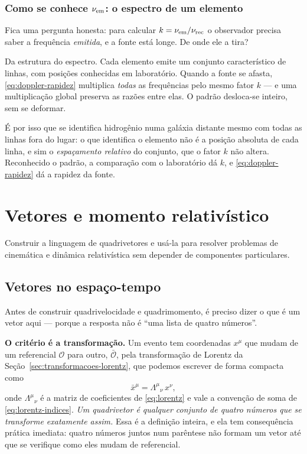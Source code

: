 \documentclass[12pt,a4paper,oneside]{book}
\theoremstyle{rgplain}
\theoremstyle{rgremark}
\newcommand{\obs}{\mathcal{O}}
\newcommand{\obsl}{\bar{\mathcal{O}}}
\begin{document}
\subsection*{Como se conhece $\nu_{\rm em}$: o espectro de um elemento}

Fica uma pergunta honesta: para calcular $k=\nu_{\rm em}/\nu_{\rm rec}$ o
observador precisa saber a frequência \emph{emitida}, e a fonte está longe. De
onde ele a tira?

Da estrutura do espectro. Cada elemento emite um conjunto característico de
linhas, com posições conhecidas em laboratório. Quando a fonte se afasta,
\eqref{eq:doppler-rapidez} multiplica \emph{todas} as frequências pelo mesmo
fator $k$ --- e uma multiplicação global preserva as razões entre elas. O
padrão desloca-se inteiro, sem se deformar.

\begin{atencao}
É por isso que se identifica hidrogênio numa galáxia distante mesmo com todas
as linhas fora do lugar: o que identifica o elemento não é a posição absoluta
de cada linha, e sim o \emph{espaçamento relativo} do conjunto, que o fator $k$
não altera. Reconhecido o padrão, a comparação com o laboratório dá $k$, e
\eqref{eq:doppler-rapidez} dá a rapidez da fonte.
\end{atencao}

\chapter{Vetores e momento relativístico}
\label{chap:vetores}

\begin{objetivos}
Construir a linguagem de quadrivetores e usá-la para resolver problemas de
cinemática e dinâmica relativística sem depender de componentes particulares.
\end{objetivos}

\section{Vetores no espaço-tempo}
\label{sec:vetores-espacotempo}

Antes de construir quadrivelocidade e quadrimomento, é preciso dizer o que é
um vetor aqui --- porque a resposta não é ``uma lista de quatro números''.

\textbf{O critério é a transformação.} Um evento tem coordenadas $x^\mu$ que
mudam de um referencial $\obs$ para outro, $\obsl$, pela transformação de
Lorentz da
Seção~\ref{sec:transformacoes-lorentz}, que podemos escrever de forma
compacta como
\begin{equation}
  \bar x^\mu=\Lambda^\mu{}_\nu\,x^\nu ,
  \label{eq:lorentz-matriz}
\end{equation}
onde $\Lambda^\mu{}_\nu$ é a matriz de coeficientes de \eqref{eq:lorentz} e
vale a convenção de soma de \eqref{eq:lorentz-indices}. \emph{Um quadrivetor é
qualquer conjunto de quatro números que se transforme exatamente assim.} Essa
é a definição inteira, e ela tem consequência prática imediata: quatro números
juntos num parêntese não formam um vetor até que se verifique como eles mudam
de referencial.
\end{document}
